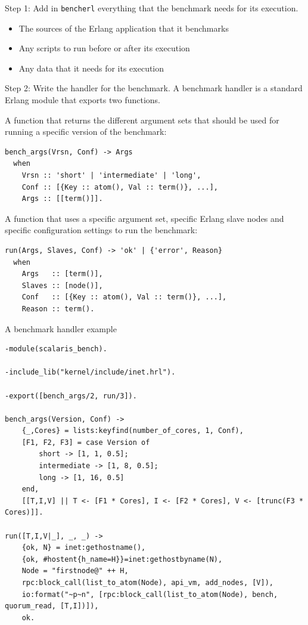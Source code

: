 \documentclass{beamer}
\begin{document}
\begin{frame}[t]{Step 1: Add in \texttt{bencherl} everything that the benchmark needs for its execution.}
	\begin{itemize}
		\item The sources of the Erlang application that it benchmarks
		\item Any scripts to run before or after its execution
		\item Any data that it needs for its execution
	\end{itemize}
\end{frame}

\begin{frame}[fragile]{Step 2: Write the handler for the benchmark.}
	A benchmark handler is a standard Erlang module that exports two functions.
	\vspace{10pt}

	A function that returns the different argument sets that should be used for running a specific version of the benchmark:

	\begin{lstlisting}[basicstyle=\tiny,frame=single]
bench_args(Vrsn, Conf) -> Args
  when
    Vrsn :: 'short' | 'intermediate' | 'long',
    Conf :: [{Key :: atom(), Val :: term()}, ...],
    Args :: [[term()]].
	\end{lstlisting}

	A function that uses a specific argument set, specific Erlang slave nodes and specific configuration settings to run the benchmark:

    \begin{lstlisting}[basicstyle=\tiny,frame=single]
run(Args, Slaves, Conf) -> 'ok' | {'error', Reason}
  when
    Args   :: [term()],
    Slaves :: [node()],
    Conf   :: [{Key :: atom(), Val :: term()}, ...],
    Reason :: term().
	\end{lstlisting}

\end{frame}

\begin{frame}[fragile]{A benchmark handler example}

    \begin{lstlisting}[basicstyle=\tiny,frame=single]
-module(scalaris_bench).

-include_lib("kernel/include/inet.hrl").

-export([bench_args/2, run/3]).

bench_args(Version, Conf) ->
    {_,Cores} = lists:keyfind(number_of_cores, 1, Conf),
	[F1, F2, F3] = case Version of
		short -> [1, 1, 0.5];
		intermediate -> [1, 8, 0.5];
		long -> [1, 16, 0.5]
	end,
	[[T,I,V] || T <- [F1 * Cores], I <- [F2 * Cores], V <- [trunc(F3 * Cores)]].

run([T,I,V|_], _, _) ->
	{ok, N} = inet:gethostname(),
	{ok, #hostent{h_name=H}}=inet:gethostbyname(N),
	Node = "firstnode@" ++ H,
	rpc:block_call(list_to_atom(Node), api_vm, add_nodes, [V]),
	io:format("~p~n", [rpc:block_call(list_to_atom(Node), bench, quorum_read, [T,I])]),
	ok.
	\end{lstlisting}
\end{frame}
\end{document}
